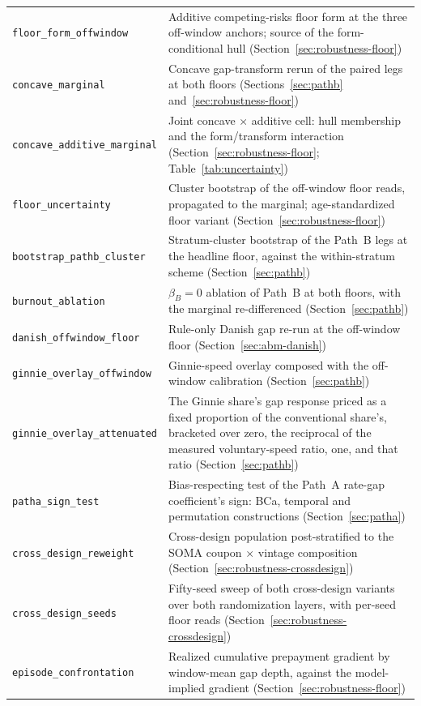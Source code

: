 \documentclass[12pt]{article}
\begin{document}
{\begin{longtable}{@{}p{5.4cm}p{8.8cm}@{}}
\texttt{floor\_form\_offwindow} & Additive competing-risks floor form at the three off-window anchors; source of the form-conditional hull (Section~\ref{sec:robustness-floor}) \\
\texttt{concave\_marginal} & Concave gap-transform rerun of the paired legs at both floors (Sections~\ref{sec:pathb} and~\ref{sec:robustness-floor}) \\
\texttt{concave\_additive\_marginal} & Joint concave $\times$ additive cell: hull membership and the form/transform interaction (Section~\ref{sec:robustness-floor}; Table~\ref{tab:uncertainty}) \\
\texttt{floor\_uncertainty} & Cluster bootstrap of the off-window floor reads, propagated to the marginal; age-standardized floor variant (Section~\ref{sec:robustness-floor}) \\
\texttt{bootstrap\_pathb\_cluster} & Stratum-cluster bootstrap of the Path~B legs at the headline floor, against the within-stratum scheme (Section~\ref{sec:pathb}) \\
\texttt{burnout\_ablation} & $\beta_B = 0$ ablation of Path~B at both floors, with the marginal re-differenced (Section~\ref{sec:pathb}) \\
\texttt{danish\_offwindow\_floor} & Rule-only Danish gap re-run at the off-window floor (Section~\ref{sec:abm-danish}) \\
\texttt{ginnie\_overlay\_offwindow} & Ginnie-speed overlay composed with the off-window calibration (Section~\ref{sec:pathb}) \\
\texttt{ginnie\_overlay\_attenuated} & The Ginnie share's gap response priced as a fixed proportion of the conventional share's, bracketed over zero, the reciprocal of the measured voluntary-speed ratio, one, and that ratio (Section~\ref{sec:pathb}) \\
\texttt{patha\_sign\_test} & Bias-respecting test of the Path~A rate-gap coefficient's sign: BCa, temporal and permutation constructions (Section~\ref{sec:patha}) \\
\texttt{cross\_design\_reweight} & Cross-design population post-stratified to the SOMA coupon $\times$ vintage composition (Section~\ref{sec:robustness-crossdesign}) \\
\texttt{cross\_design\_seeds} & Fifty-seed sweep of both cross-design variants over both randomization layers, with per-seed floor reads (Section~\ref{sec:robustness-crossdesign}) \\
\texttt{episode\_confrontation} & Realized cumulative prepayment gradient by window-mean gap depth, against the model-implied gradient (Section~\ref{sec:robustness-floor}) \\

\end{longtable}}
\end{document}
